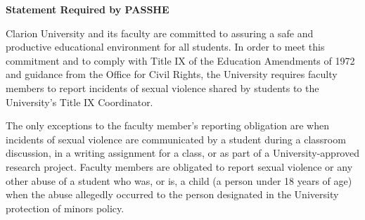 \documentclass{article}
\begin{document}
\clearpage

\begin{center}
{\bf Statement Required by PASSHE}  
\end{center}

Clarion University and its faculty are committed to assuring a safe and productive educational environment for all students. In order to meet this commitment and to comply with Title IX of the Education Amendments of 1972 and guidance from  the Office for Civil Rights, the University requires faculty members to report incidents of sexual violence shared by students to the University's Title IX Coordinator.                         

The only exceptions to the faculty member's reporting obligation are when incidents of sexual violence are communicated by a student during a classroom discussion, in a writing assignment for a class, or as part of a University-approved research project.                           
Faculty members are obligated to report sexual violence or any other abuse of a student who was, or is, a child (a person under 18 years of age) when the abuse allegedly occurred to the person designated in the University protection of minors policy. 
\end{document}

